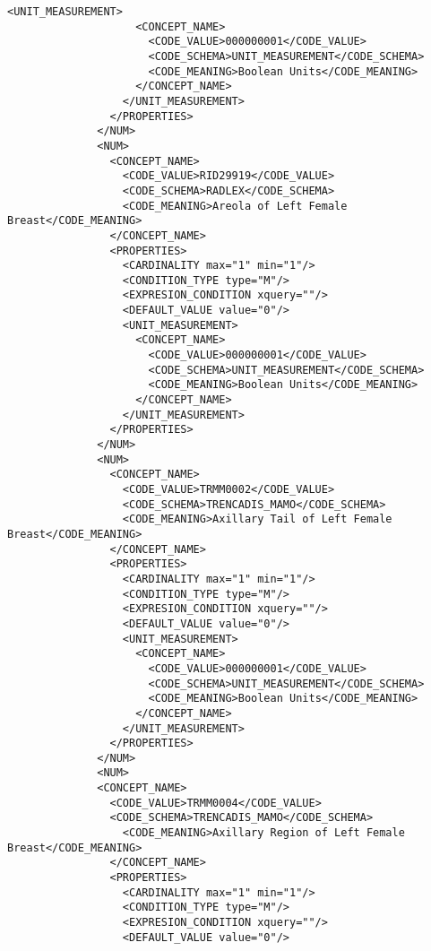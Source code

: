 \begin{lstlisting}[label=dicom-template,caption=Plantilla de un informe estructurado de una exploración de mama]
                  <UNIT_MEASUREMENT>
                    <CONCEPT_NAME>
                      <CODE_VALUE>000000001</CODE_VALUE>
                      <CODE_SCHEMA>UNIT_MEASUREMENT</CODE_SCHEMA>
                      <CODE_MEANING>Boolean Units</CODE_MEANING>
                    </CONCEPT_NAME>
                  </UNIT_MEASUREMENT>
                </PROPERTIES>
              </NUM>
              <NUM>
                <CONCEPT_NAME>
                  <CODE_VALUE>RID29919</CODE_VALUE>
                  <CODE_SCHEMA>RADLEX</CODE_SCHEMA>
                  <CODE_MEANING>Areola of Left Female Breast</CODE_MEANING>
                </CONCEPT_NAME>
                <PROPERTIES>
                  <CARDINALITY max="1" min="1"/>
                  <CONDITION_TYPE type="M"/>
                  <EXPRESION_CONDITION xquery=""/>
                  <DEFAULT_VALUE value="0"/>
                  <UNIT_MEASUREMENT>
                    <CONCEPT_NAME>
                      <CODE_VALUE>000000001</CODE_VALUE>
                      <CODE_SCHEMA>UNIT_MEASUREMENT</CODE_SCHEMA>
                      <CODE_MEANING>Boolean Units</CODE_MEANING>
                    </CONCEPT_NAME>
                  </UNIT_MEASUREMENT>
                </PROPERTIES>
              </NUM>
              <NUM>
                <CONCEPT_NAME>
                  <CODE_VALUE>TRMM0002</CODE_VALUE>
                  <CODE_SCHEMA>TRENCADIS_MAMO</CODE_SCHEMA>
                  <CODE_MEANING>Axillary Tail of Left Female Breast</CODE_MEANING>
                </CONCEPT_NAME>
                <PROPERTIES>
                  <CARDINALITY max="1" min="1"/>
                  <CONDITION_TYPE type="M"/>
                  <EXPRESION_CONDITION xquery=""/>
                  <DEFAULT_VALUE value="0"/>
                  <UNIT_MEASUREMENT>
                    <CONCEPT_NAME>
                      <CODE_VALUE>000000001</CODE_VALUE>
                      <CODE_SCHEMA>UNIT_MEASUREMENT</CODE_SCHEMA>
                      <CODE_MEANING>Boolean Units</CODE_MEANING>
                    </CONCEPT_NAME>
                  </UNIT_MEASUREMENT>
                </PROPERTIES>
              </NUM>
              <NUM>
              <CONCEPT_NAME>
                <CODE_VALUE>TRMM0004</CODE_VALUE>
                <CODE_SCHEMA>TRENCADIS_MAMO</CODE_SCHEMA>
                  <CODE_MEANING>Axillary Region of Left Female Breast</CODE_MEANING>
                </CONCEPT_NAME>
                <PROPERTIES>
                  <CARDINALITY max="1" min="1"/>
                  <CONDITION_TYPE type="M"/>
                  <EXPRESION_CONDITION xquery=""/>
                  <DEFAULT_VALUE value="0"/>

\end{lstlisting}
